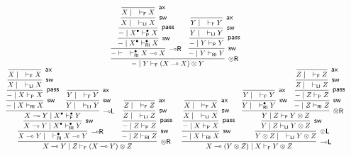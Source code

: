 \documentclass[copyright,creativecommons]{eptcs}
\theoremstyle{definition}
\newcommand{\tl}{\otimes \mathsf{L}}
\newcommand{\tr}{\otimes \mathsf{R}}
\newcommand{\lright}{{\multimap}\mathsf{R}}
\newcommand{\lleft}{{\multimap}\mathsf{L}}
\newcommand{\pass}{\mathsf{pass}}
\newcommand{\ax}{\mathsf{ax}}
\newcommand{\ot}{\otimes}
\newcommand{\lolli}{\multimap}
\newcommand{\RI}{\mathsf{RI}}
\newcommand{\LI}{\mathsf{LI}}
\newcommand{\Pass}{\mathsf{P}}
\newcommand{\F}{\mathsf{F}}
\newcommand{\proofbox}[1]{\begin{tabular}{l} #1 \end{tabular}}
\begin{document}
 \begin{displaymath}
 \small
   \begin{array}{c}
    \proofbox{
     \infer[\tr]{{-} \mid Y \vdash_{\F} (X \lolli X) \ot Y}{
      \infer[\lright]{{-} \vdash \quad \vdash^{\bullet}_{\RI} X \lolli X}{
        \infer[\mathsf{sw}]{{-} \mid X^{\bullet} \vdash^{\bullet}_{\RI} X}{
          \infer[\pass]{{-} \mid X^{\bullet} \vdash^{\bullet}_{\Pass} X}{
            \infer[\mathsf{sw}]{X \mid \quad \vdash_{\LI} X}{
              \infer[\ax]{X \mid \quad \vdash_{\F} X}{}
            }
          }
        }
      }
      &
      \infer[\mathsf{sw}]{{-} \mid Y \vdash_{\RI} Y}{
        \infer[\pass]{{-} \mid Y \vdash_{\Pass} Y}{
          \infer[\mathsf{sw}]{Y \mid \quad \vdash_{\LI} Y}{
            \infer[\ax]{Y \mid \quad \vdash_{\F} Y}{}
          }
        }
      }
     }
     }
 \\
   \proofbox{
     \infer[\tr]{X \lolli Y \mid Z \vdash_{\F} (X \lolli Y) \ot Z}{
      \infer[\lright]{X \lolli Y \mid \quad \vdash^{\bullet}_{\RI} X \lolli Y}{
        \infer[\mathsf{sw}]{X \lolli Y \mid X^{\bullet} \vdash^{\bullet}_{\RI} Y}{
          \infer[\lleft]{X \lolli Y \mid X^{\bullet} \vdash^{\bullet}_{\F} Y}{
            \infer[\mathsf{sw}]{{-} \mid X \vdash_{\RI} X}{
              \infer[\pass]{{-} \mid X \vdash_{\Pass} X}{
                \infer[\mathsf{sw}]{X \mid \quad \vdash_{\LI} X}{
                  \infer[\ax]{X \mid \quad \vdash_{\F} X}{}
                }
              }
            }
            &
            \infer[\mathsf{sw}]{Y \mid \quad \vdash_{\LI} Y}{
              \infer[\ax]{Y \mid \quad \vdash_{\F} Y}{}
            }
          }
        }
      }
      &
      \infer[\mathsf{sw}]{{-} \mid Z \vdash_{\RI} Z}{
        \infer[\pass]{{-} \mid Z \vdash_{\Pass} Z}{
          \infer[\mathsf{sw}]{Z \mid \quad \vdash_{\LI} Z}{
            \infer[\ax]{Z \mid \quad \vdash_{\F} Z}{}
          }
        }
      }
     }
%
     \quad
     \infer[\lleft]{X \lolli (Y \ot Z) \mid X \vdash_{\F} Y \ot Z}{
      \infer[\mathsf{sw}]{{-} \mid X \vdash_{\RI} X}{
        \infer[\pass]{{-} \mid X \vdash_{\Pass} X}{
          \infer[\mathsf{sw}]{X \mid \quad \vdash_{\LI} X}{
            \infer[\ax]{X \mid \quad \vdash_{\F} X}{}
          }
        }
      }
      &
      \infer[\tl]{Y \ot Z \mid \quad \vdash_{\LI} Y \ot Z}{
        \infer[\mathsf{sw}]{Y \mid Z \vdash_{\LI} Y \ot Z}{
          \infer[\tr]{Y \mid Z \vdash_{\F} Y \ot Z}{
            \infer[\mathsf{sw}]{Y \mid \quad \vdash_{\RI}^{\bullet} Y}{
              \infer[\ax]{Y \mid \quad \vdash_{\F} Y}{}
            }
            &
            \infer[\mathsf{sw}]{{-} \mid Z \vdash_{\RI} Z}{
              \infer[\pass]{{-} \mid Z \vdash_{\Pass} Z}{
                \infer[\mathsf{sw}]{Z \mid \quad \vdash_{\LI} Z}{
                  \infer[\ax]{Z \mid \quad \vdash_{\F} Z}{}
                }
              }
            }
          }
        }
      }
     }
     }
    \end{array}
   \normalsize
 \end{displaymath}
\end{document}
